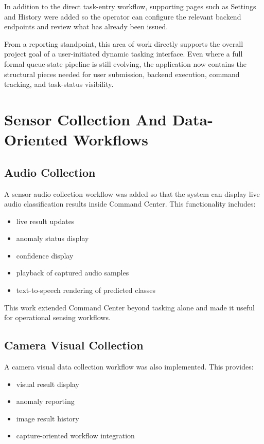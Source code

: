 \documentclass[11pt]{article}
\begin{document}
In addition to the direct task-entry workflow, supporting pages such as Settings and History were added so the operator can configure the relevant backend endpoints and review what has already been issued.

From a reporting standpoint, this area of work directly supports the overall project goal of a user-initiated dynamic tasking interface. Even where a full formal queue-state pipeline is still evolving, the application now contains the structural pieces needed for user submission, backend execution, command tracking, and task-status visibility.

\section{Sensor Collection And Data-Oriented Workflows}

\subsection{Audio Collection}

A sensor audio collection workflow was added so that the system can display live audio classification results inside Command Center. This functionality includes:

\begin{itemize}
  \item live result updates
  \item anomaly status display
  \item confidence display
  \item playback of captured audio samples
  \item text-to-speech rendering of predicted classes
\end{itemize}

This work extended Command Center beyond tasking alone and made it useful for operational sensing workflows.

\subsection{Camera Visual Collection}

A camera visual data collection workflow was also implemented. This provides:

\begin{itemize}
  \item visual result display
  \item anomaly reporting
  \item image result history
  \item capture-oriented workflow integration
\end{itemize}
\end{document}
